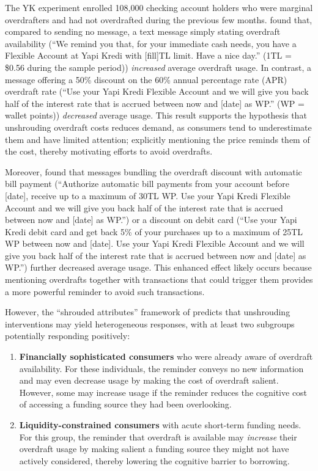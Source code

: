 \documentclass[12pt]{article}
\begin{document}
The YK experiment enrolled 108,000 checking account holders who were marginal overdrafters and had not overdrafted during the previous few months. \citet{alan2018} found that, compared to sending no message, a text message simply stating overdraft availability (``We remind you that, for your immediate cash needs, you have a Flexible Account at Yapi Kredi with [fill]TL limit. Have a nice day.'' (1TL = \$0.56 during the sample period)) \emph{increased} average overdraft usage. In contrast, a message offering a 50{\%} discount on the 60{\%} annual percentage rate (APR) overdraft rate (``Use your Yapi Kredi Flexible Account and we will give you back half of the interest rate that is accrued between now and [date] as WP.'' (WP = wallet points)) \emph{decreased} average usage. This result supports the hypothesis that unshrouding overdraft costs reduces demand, as consumers tend to underestimate them and have limited attention; explicitly mentioning the price reminds them of the cost, thereby motivating efforts to avoid overdrafts.

Moreover, \citet{alan2018} found that messages bundling the overdraft discount with automatic bill payment (``Authorize automatic bill payments from your account before [date], receive up to a maximum of 30TL WP. Use your Yapi Kredi Flexible Account and we will give you back half of the interest rate that is accrued between now and [date] as WP.'') or a discount on debit card (``Use your Yapi Kredi debit card and get back 5{\%} of your purchases up to a maximum of 25TL WP between now and [date]. Use your Yapi Kredi Flexible Account and we will give you back half of the interest rate that is accrued between now and [date] as WP.'') further decreased average usage. This enhanced effect likely occurs because mentioning overdrafts together with transactions that could trigger them provides a more powerful reminder to avoid such transactions.

However, the ``shrouded attributes'' framework of \citet{gabaix2006} predicts that unshrouding interventions may yield heterogeneous responses, with at least two subgroups potentially responding positively:
\begin{enumerate}
	\item \textbf{Financially sophisticated consumers} who were already aware of overdraft availability. For these individuals, the reminder conveys no new information and may even decrease usage by making the cost of overdraft salient. However, some may increase usage if the reminder reduces the cognitive cost of accessing a funding source they had been overlooking.
	\item \textbf{Liquidity-constrained consumers} with acute short-term funding needs. For this group, the reminder that overdraft is available may \emph{increase} their overdraft usage by making salient a funding source they might not have actively considered, thereby lowering the cognitive barrier to borrowing.
\end{enumerate}
\end{document}
